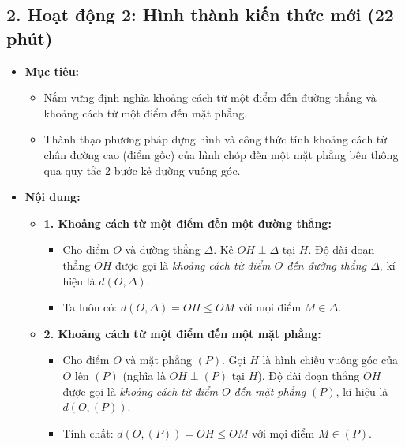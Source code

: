 \documentclass[12pt, a4paper]{article}
\begin{document}
\subsection*{2. Hoạt động 2: Hình thành kiến thức mới (22 phút)}

\begin{itemize}[leftmargin=1.2cm]
    \item[a)] \textbf{Mục tiêu:}
    \begin{itemize}[leftmargin=0.6cm]
        \item Nắm vững định nghĩa khoảng cách từ một điểm đến đường thẳng và khoảng cách từ một điểm đến mặt phẳng.
        \item Thành thạo phương pháp dựng hình và công thức tính khoảng cách từ chân đường cao (điểm gốc) của hình chóp đến một mặt phẳng bên thông qua quy tắc 2 bước kẻ đường vuông góc.
    \end{itemize}

    \item[b)] \textbf{Nội dung:}
    \begin{itemize}[leftmargin=0.6cm]
        \item \textbf{1. Khoảng cách từ một điểm đến một đường thẳng:}
        \begin{itemize}
            \item Cho điểm $O$ và đường thẳng $\Delta$. Kẻ $OH \perp \Delta$ tại $H$. Độ dài đoạn thẳng $OH$ được gọi là \textit{khoảng cách từ điểm $O$ đến đường thẳng $\Delta$}, kí hiệu là $d(O, \Delta)$.
            \item Ta luôn có: $d(O, \Delta) = OH \le OM$ với mọi điểm $M \in \Delta$.
        \end{itemize}

        \item \textbf{2. Khoảng cách từ một điểm đến một mặt phẳng:}
        \begin{itemize}
            \item Cho điểm $O$ và mặt phẳng $(P)$. Gọi $H$ là hình chiếu vuông góc của $O$ lên $(P)$ (nghĩa là $OH \perp (P)$ tại $H$). Độ dài đoạn thẳng $OH$ được gọi là \textit{khoảng cách từ điểm $O$ đến mặt phẳng $(P)$}, kí hiệu là $d(O, (P))$.
            \item Tính chất: $d(O, (P)) = OH \le OM$ với mọi điểm $M \in (P)$.
        \end{itemize}


\end{itemize}
\end{itemize}
\end{document}
